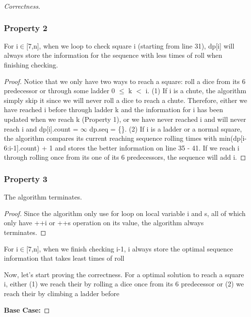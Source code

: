 \documentclass[openany]{article}
\begin{document}
\begin{proof}[Correctness]{}
\subsubsection*{Property 2}
    For i$\in$[7,n], when we loop to check square i (starting from line 31), dp[i] will always store the information for the sequence with less times of roll when finishing checking.
    \begin{proof}
        Notice that we only have two ways to reach a square: roll a dice from its 6 predecessor or through some ladder 0 $\leq$ k $<$ i.
        (1) If i is a chute, the algorithm simply skip it since we will never roll a dice to reach a chute. Therefore, either we have reached i before through ladder k and the information for i has been updated when we reach k (Property 1), or we have never reached i and will never reach i and dp[i].count = $\infty$ dp.seq = \{\}.
        (2) If i is a ladder or a normal square, the algorithm compares its current reaching sequence rolling times with min(dp[i-6:i-1].count) + 1 and stores the better information on line 35 - 41. If we reach i through rolling once from its one of its 6 predecessors, the sequence will add i.
    \end{proof}

\subsubsection*{Property 3}
    The algorithm terminates.
    \begin{proof}
        Since the algorithm only use for loop on local variable i and s, all of which only have ++i or ++s operation on its value, the algorithm always terminates.
    \end{proof}

\begin{lemma*}{For i$\in$[7,n], when we finish checking i-1, i always store the optimal sequence information that takes least times of roll}
    

\end{lemma*}


Now, let's start proving the correctness.
For a optimal solution to reach a square i, either (1) we reach their by rolling a dice once from its 6 predecessor or (2) we reach their by climbing a ladder before




    \textbf{Base Case:}
\end{proof}
\end{document}
